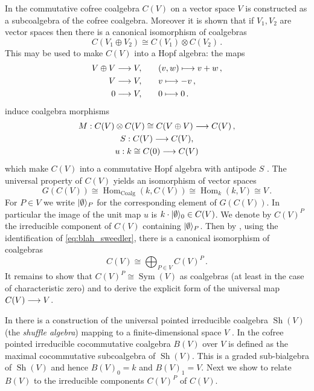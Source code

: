 \documentclass[english,letter paper,12pt,reqno]{article}
\DeclarePairedDelimiter\ket{\lvert}{\rangle}
\theoremstyle{example}
\numberwithin{equation}{section}
\def\sh{\operatorname{Sh}}
\def\Hom{\operatorname{Hom}}
\def\vacu{\ket{\emptyset}}
\DeclareMathOperator{\Sym}{Sym}
\begin{document}
In \cite[Theorem 6.4.3]{sweedler} the commutative cofree coalgebra $C(V)$ on a vector space $V$ is constructed as a subcoalgebra of the cofree coalgebra. Moreover it is shown that if $V_1, V_2$ are vector spaces then there is a canonical isomorphism of coalgebras \cite[Theorem 6.4.4]{sweedler}
\[
C(V_1 \oplus V_2) \cong C(V_1) \otimes C(V_2)\,.
\]
This may be used to make $C(V)$ into a Hopf algebra: the maps
\begin{align*}
V \oplus V \longrightarrow V, &\qquad (v,w) \longmapsto v + w\,,\\
V \longrightarrow V, &\qquad v \longmapsto -v\,,\\
0 \longrightarrow V, &\qquad 0 \longmapsto 0\,.
\end{align*}
induce coalgebra morphisms
\begin{gather*}
M: C(V) \otimes C(V) \cong C(V \oplus V) \longrightarrow C(V)\,,\\
S: C(V) \longrightarrow C(V),\\
u: k \cong C(0) \longrightarrow C(V)
\end{gather*}
which make $C(V)$ into a commutative Hopf algebra with antipode $S$ \cite[Theorem 6.4.8]{sweedler}. The universal property of $C(V)$ yields an isomorphism of vector spaces
\begin{equation}\label{eq:blah_sweedler}
G(C(V)) \cong \Hom_{\operatorname{Coalg}}(k, C(V)) \cong \Hom_k(k, V) \cong V\,.
\end{equation}
For $P \in V$ we write $\vacu_P$ for the corresponding element of $G(C(V))$. In particular the image of the unit map $u$ is $k \cdot \vacu_0 \in C(V)$. We denote by $C(V)^P$ the irreducible component of $C(V)$ containing $\vacu_P$. Then by \cite[Proposition 8.1.2]{sweedler}, using the identification of \eqref{eq:blah_sweedler}, there is a canonical isomorphism of coalgebras
\[
C(V) \cong \bigoplus_{P \in V} C(V)^P\,.
\]
It remains to show that $C(V)^P \cong \Sym(V)$ as coalgebras (at least in the case of characteristic zero) and to derive the explicit form of the universal map $C(V) \longrightarrow V$.

In \cite[Chapter 12]{sweedler} there is a construction of the universal pointed irreducible coalgebra $\sh(V)$ (the \emph{shuffle algebra}) mapping to a finite-dimensional space $V$ \cite[Lemma 12.0.1]{sweedler}. In \cite[Section 12.2]{sweedler} the cofree pointed irreducible cocommutative coalgebra $B(V)$ over $V$ is defined as the maximal cocommutative subcoalgebra of $\sh(V)$. This is a graded sub-bialgebra of $\sh(V)$ and hence $B(V)_0 = k$ and $B(V)_1 = V$. Next we show to relate $B(V)$ to the irreducible components $C(V)^P$ of $C(V)$. 
\end{document}
